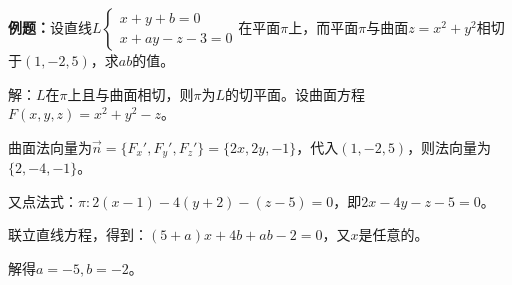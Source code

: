 \documentclass[UTF8, 12pt]{ctexart}
\begin{document}
\textbf{例题：}设直线$L\left\{\begin{array}{l}
    x+y+b=0 \\
    x+ay-z-3=0
\end{array}\right.$在平面$\pi$上，而平面$\pi$与曲面$z=x^2+y^2$相切于$(1,-2,5)$，求$ab$的值。

解：$L$在$\pi$上且与曲面相切，则$\pi$为$L$的切平面。设曲面方程$F(x,y,z)=x^2+y^2-z$。

曲面法向量为$\vec{n}=\{F_x',F_y',F_z'\}=\{2x,2y,-1\}$，代入$(1,-2,5)$，则法向量为$\{2,-4,-1\}$。

又点法式：$\pi:2(x-1)-4(y+2)-(z-5)=0$，即$2x-4y-z-5=0$。

联立直线方程，得到：$(5+a)x+4b+ab-2=0$，又$x$是任意的。

解得$a=-5,b=-2$。
\end{document}
